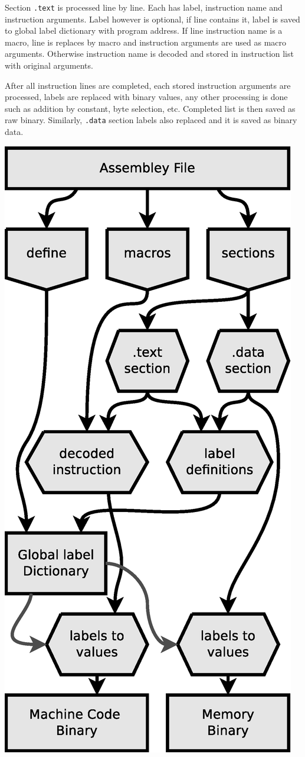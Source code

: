 Section \texttt{.text} is processed line by line. Each has label, instruction name and instruction arguments. Label however is optional, if line contains it, label is saved to global label dictionary with program address. If line instruction name is a macro, line is replaces by macro and instruction arguments are used as macro arguments. Otherwise instruction name is decoded and stored in instruction list with original arguments.

After all instruction lines are completed, each stored instruction arguments are processed, labels are replaced with binary values, any other processing is done such as addition by constant, byte selection, etc. Completed list is then saved as raw binary. Similarly, \texttt{.data} section labels also replaced and it is saved as binary data.

\begin{colfigure}
	\centering
	\includegraphics[scale=0.4]{../resources/assembler.eps}

\end{colfigure}
